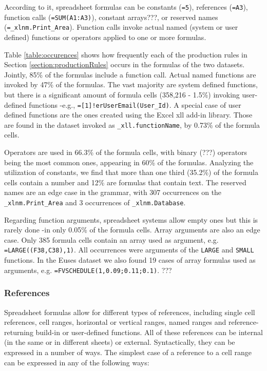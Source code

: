 \documentclass[conference]{IEEEtran}
\begin{document}
According to it, spreadsheet formulas can be constants (\texttt{=5}), references (\texttt{=A3}), function calls (\texttt{=SUM(A1:A3)}), constant arrays???, or reserved names (\texttt{=_xlnm.Print_Area}). Function calls invoke actual named (system or user defined) functions or operators applied to one or more formulas. 
	
Table \ref{table:occurences} shows how frequently each of the production rules in Section \ref{section:productionRules} occurs in the formulas of the two datasets. Jointly, 85\% of the formulas include a function call. Actual named functions are invoked by 47\% of the formulas. The vast majority are system defined functions, but there is a significant amount of formula cells (358,216 - 1.5\%) invoking user-defined functions -e.g., \texttt{=[1]!erUserEmail(User_Id)}. A special case of user defined functions are the ones created using the Excel xll add-in library. Those are found in the dataset invoked as \texttt{_xll.functionName}, by 0.73\% of the formula cells.

Operators are used in 66.3\% of the formula cells, with binary (???) operators being the most common ones, appearing in 60\% of the formulas. Analyzing the utilization of constants, we find that more than one third (35.2\%) of the formula cells contain a number and 12\% are formulas that contain text. The reserved names are an edge case in the grammar, with 307 occurrences on the \texttt{_xlnm.Print_Area} and 3 occurrences of  \texttt{_xlnm.Database}.

Regarding function arguments, spreadsheet systems allow empty ones but this is rarely done -in only 0.05\% of the formula cells. Array arguments are also an edge case. Only 385 formula cells contain an array used as argument, e.g. \texttt{=LARGE((F38,C38),1)}. All occurrences were arguments of the \texttt{LARGE} and \texttt{SMALL} functions. In the Euses dataset we also found 19 cases of array formulas used as arguments, e.g. \texttt{=FVSCHEDULE(1,{0.09;0.11;0.1})}. ???

\subsubsection{References}
 
Spreadsheet formulas allow for different types of references, including single cell references, cell ranges, horizontal or vertical ranges, named ranges and reference-returning build-in or user-defined functions. All of these references can be internal (in the same or in different sheets) or external. Syntactically, they can be expressed in a number of ways. The simplest case of a reference to a cell range can be expressed in any of the following ways:
\end{document}

